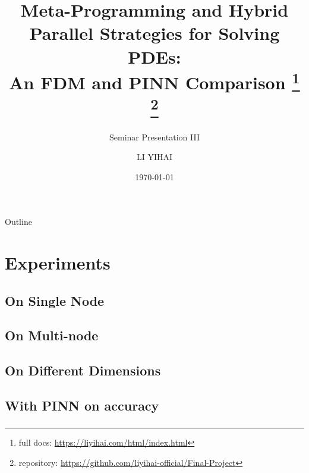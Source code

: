 \documentclass{my-Presentation}
\title[An FDM and PINN Comparison]{
  Meta-Programming and Hybrid Parallel Strategies for Solving PDEs: \\An FDM and PINN Comparison
  \footnote{full docs: \url{https://liyihai.com/html/index.html}}
  \footnote{repository: \url{https://github.com/liyihai-official/Final-Project}}
}
\subtitle{Seminar Presentation III}
\author[LI Yihai]{
  \normalsize
  LI YIHAI \\[1ex]
  \vspace*{-.5em}
}
\institute[Mathematics Institute]{
  Student ID: 23345919 \\[1ex]
  Supervision: Michael Peardon
}
\date{\today \vspace*{-1em}}
\begin{document}
\begin{frame}
  \titlepage
\end{frame}

\begin{frame}{Outline}
  \begin{multicols}{2}
    \tableofcontents
  \end{multicols}
\end{frame}





\section{Experiments}
\subsection{On Single Node}
\begin{frame}
  \frametitle{}

  

\end{frame}

\subsection{On Multi-node}
\begin{frame}
  \frametitle{}

  

\end{frame}

\subsection{On Different Dimensions}
\begin{frame}
  \frametitle{}

  

\end{frame}

\subsection{With PINN on accuracy}
\begin{frame}
  \frametitle{}

  

\end{frame}
\end{document}
